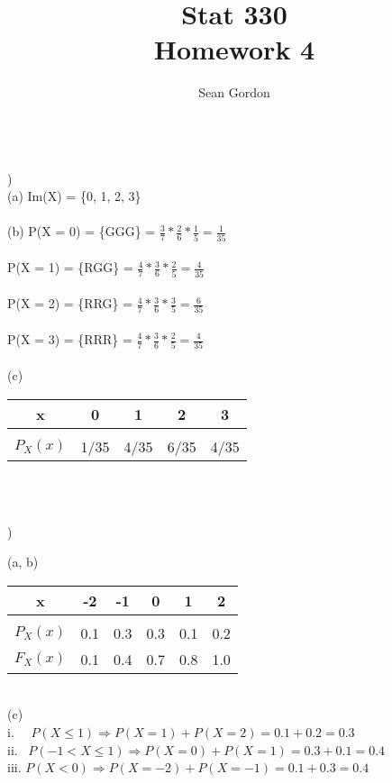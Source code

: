 \documentclass[12pt]{article}
\title{Stat 330\\Homework 4}
\author{Sean Gordon}
\begin{document}
\maketitle


\noindent\hrulefill \\


)\\
\indent (a) Im(X) = \{0, 1, 2, 3\}\\\\

\indent        (b) P(X = 0) =  \{GGG\} = {\Large$ \frac{3}{7}*\frac{2}{6}*\frac{1}{5} = \frac{1}{35}$}\\\\
\indent \indent P(X = 1) =  \{RGG\} = {\Large$ \frac{4}{7}*\frac{3}{6}*\frac{2}{5} = \frac{4}{35}$}\\\\
\indent \indent P(X = 2) =  \{RRG\} = {\Large$ \frac{4}{7}*\frac{3}{6}*\frac{3}{5} = \frac{6}{35}$}\\\\
\indent \indent P(X = 3) =  \{RRR\} = {\Large$ \frac{4}{7}*\frac{3}{6}*\frac{2}{5} = \frac{4}{35}$}\\\\


\indent (c)
\begin{tabular}{c|cccc}
 x & 0 & 1 & 2 & 3 \\
 \hline &&&&\\[-1em]
$P_X(x)$ & 1/35 & 4/35 & 6/35 & 4/35\\
\end{tabular}\\


\noindent \hrulefill \\
\pagebreak


)

\indent (a, b) 
\begin{tabular}{c|ccccc}
 x & -2 & -1 & 0 & 1 & 2 \\
 \hline &&&&&\\[-1em]
$P_X(x)$ & 0.1 & 0.3 & 0.3 & 0.1 & 0.2\\
$F_X(x)$ & 0.1 & 0.4 & 0.7 & 0.8 & 1.0\\
\end{tabular}\\


\indent (c) \\
\indent \indent i. \ \ $P(X\le 1) \Rightarrow P(X = 1) + P(X = 2) = 0.1+0.2 = 0.3$\\[.4em]
\indent \indent ii. \ $P(-1 < X \le 1) \Rightarrow P(X=0)+P(X=1) = 0.3+0.1 = 0.4$\\[.4em]
\indent \indent iii. $P(X < 0) \Rightarrow P(X=-2)+P(X=-1) = 0.1+0.3 = 0.4$\\
\end{document}
